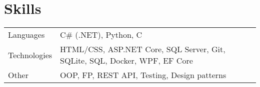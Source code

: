 \documentclass[a4paper,12pt]{article}
\begin{document}
\section{Skills}
\begin{tabularx}{\linewidth}{@{}l X@{}}
Languages &  \normalsize{C\# (.NET), Python, C  }\\
Technologies &  \normalsize{HTML/CSS, ASP.NET Core, SQL Server, Git, SQLite, SQL, Docker, WPF, EF Core  }\\
Other &  \normalsize{ OOP, FP, REST API, Testing, Design patterns }\\
\end{tabularx}





\end{document}
